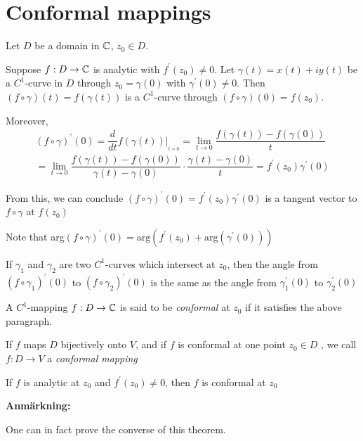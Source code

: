 \section{Conformal mappings}\par
\noindent Let $D$ be a domain in $\mathbb{C}$, $z_0\in D$.\par
\noindent Suppose $f:D\to\mathbb{C}$ is analytic with $f^{\prime}(z_0)\neq0$. Let $\gamma(t) = x(t)+iy(t)$ be a $C^1$-curve in $D$ through $z_0 = \gamma(0)$ with $\gamma^{\prime}(0)\neq0$. Then $(f\circ\gamma)(t) = f(\gamma(t))$ is a $C^1$-curve through $(f\circ\gamma)(0) = f(z_0)$.
\par\bigskip
\noindent Moreover,
\begin{equation*}
  \begin{gathered}
    (f\circ\gamma)^{\prime}(0) = \dfrac{d}{dt}f(\gamma(t))|_{_{t=0}} = \lim_{t\to0}\dfrac{f(\gamma(t))-f(\gamma(0))}{t}\\
    = \lim_{t\to0}\dfrac{f(\gamma(t))-f(\gamma(0))}{\gamma(t)-\gamma(0)}\cdot\dfrac{\gamma(t)-\gamma(0)}{t} = f^{\prime}(z_0)\gamma^{\prime}(0)
  \end{gathered}
\end{equation*}
\par\bigskip
\noindent From this, we can conclude $(f\circ\gamma)^{\prime}(0) = f^{\prime}(z_0)\gamma^{\prime}(0)$  is a tangent vector to $f\circ\gamma$ at $f(z_0)$
\par\bigskip
\noindent Note that arg$(f\circ\gamma)^{\prime}(0) =\text{arg}(f^{\prime}(z_0)+\text{arg}(\gamma^{\prime}(0)))$
\par\bigskip
\noindent If $\gamma_1$ and $\gamma_2$ are two $C^1$-curves which intersect at $z_0$, then the angle from $(f\circ\gamma_1)^{\prime}(0)$  to $(f\circ\gamma_2)^{\prime}(0)$ is the same as the angle from $\gamma_1^{\prime}(0)$  to $\gamma_2^{\prime}(0)$
\par\bigskip
\begin{theo}{}
  A $C^1$-mapping $f:D\to\mathbb{C}$ is said to be \textit{conformal} at $z_0$ if it satisfies the above paragraph.
  \par\bigskip
  \noindent If $f$ maps $D$ bijectively onto $V$, and if $f$ is conformal at one point $z_0\in D$ , we call $f:D\to V$ a \textit{conformal mapping}
\end{theo}
\par\bigskip
\begin{theo}[]{}
  If $f$ is analytic at $z_0$ and $f^{\prime}(z_0)\neq0$, then $f$ is conformal at $z_0$
\end{theo}
\par\bigskip
\noindent\textbf{Anmärkning:}\par
\noindent One can in fact prove the converse of this theorem.
\newpage
